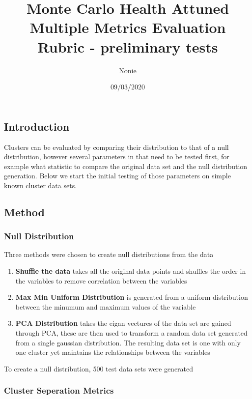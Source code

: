 \documentclass[
]{article}
\title{Monte Carlo Health Attuned Multiple Metrics Evaluation Rubric -
preliminary tests}
\author{Nonie}
\date{09/03/2020}
\begin{document}
\maketitle

\hypertarget{introduction}{%
\subsection{Introduction}\label{introduction}}

Clusters can be evaluated by comparing their distribution to that of a
null distribution, however several parameters in that need to be tested
first, for example what statistic to compare the original data set and
the null distribution generation. Below we start the initial testing of
those parameters on simple known cluster data sets.

\hypertarget{method}{%
\subsection{Method}\label{method}}

\hypertarget{null-distribution}{%
\subsubsection{Null Distribution}\label{null-distribution}}

Three methods were chosen to create null distributions from the data

\begin{enumerate}
\def\labelenumi{\arabic{enumi}.}
\item
  \textbf{Shuffle the data} takes all the original data points and
  shuffles the order in the variables to remove correlation between the
  variables
\item
  \textbf{Max Min Uniform Distribution} is generated from a uniform
  distribution between the minumum and maximum values of the variable
\item
  \textbf{PCA Distribution} takes the eigan vectures of the data set are
  gained through PCA, these are then used to transform a random data set
  generated from a single gaussian distribution. The resulting data set
  is one with only one cluster yet maintains the relationships between
  the variables
\end{enumerate}

To create a null distribution, 500 test data sets were generated

\hypertarget{cluster-seperation-metrics}{%
\subsubsection{Cluster Seperation
Metrics}\label{cluster-seperation-metrics}}
\end{document}
